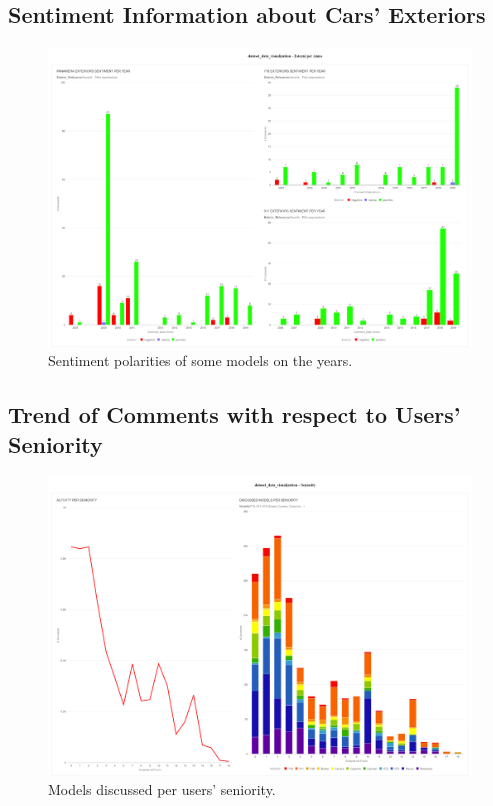\subsection{Sentiment Information about Cars' Exteriors}

\begin{figure}[H]
	\centering
	\includegraphics[width=\textwidth]{figures/odv_export/dataset_data_visualization_5.pdf}
	\caption{Sentiment polarities of some models on the years.}
	\label{fig:ext-year-snt}
\end{figure}



\subsection{Trend of Comments with respect to Users' Seniority}

\begin{figure}[H]
	\centering
	\includegraphics[width=\textwidth]{figures/odv_export/dataset_data_visualization_9.pdf}
	\caption{Models discussed per users' seniority.}
	\label{fig:model-senior}
\end{figure}




